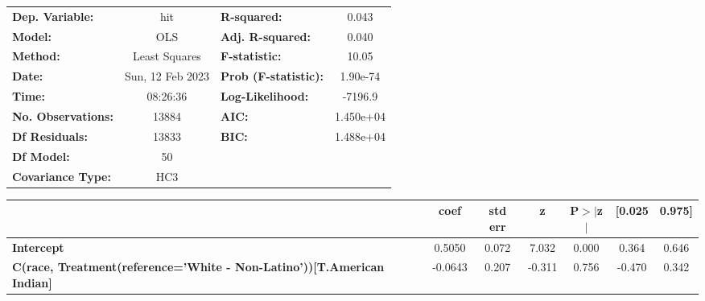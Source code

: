 \begin{center}
\begin{tabular}{lclc}
\toprule
\textbf{Dep. Variable:}                                                           &       hit        & \textbf{  R-squared:         } &     0.043   \\
\textbf{Model:}                                                                   &       OLS        & \textbf{  Adj. R-squared:    } &     0.040   \\
\textbf{Method:}                                                                  &  Least Squares   & \textbf{  F-statistic:       } &     10.05   \\
\textbf{Date:}                                                                    & Sun, 12 Feb 2023 & \textbf{  Prob (F-statistic):} &  1.90e-74   \\
\textbf{Time:}                                                                    &     08:26:36     & \textbf{  Log-Likelihood:    } &   -7196.9   \\
\textbf{No. Observations:}                                                        &       13884      & \textbf{  AIC:               } & 1.450e+04   \\
\textbf{Df Residuals:}                                                            &       13833      & \textbf{  BIC:               } & 1.488e+04   \\
\textbf{Df Model:}                                                                &          50      & \textbf{                     } &             \\
\textbf{Covariance Type:}                                                         &       HC3        & \textbf{                     } &             \\
\bottomrule
\end{tabular}
\begin{tabular}{lcccccc}
                                                                                  & \textbf{coef} & \textbf{std err} & \textbf{z} & \textbf{P$> |$z$|$} & \textbf{[0.025} & \textbf{0.975]}  \\
\midrule
\textbf{Intercept}                                                                &       0.5050  &        0.072     &     7.032  &         0.000        &        0.364    &        0.646     \\
\textbf{C(race, Treatment(reference='White - Non-Latino'))[T.American Indian]}    &      -0.0643  &        0.207     &    -0.311  &         0.756        &       -0.470    &        0.342     \\

\end{tabular}
\end{center}
